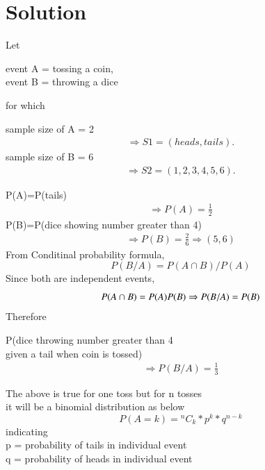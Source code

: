 \documentclass[journal,12pt,twocolumn]{IEEEtran}
\begin{document}
\section{Solution}
Let
\begin{center}
event A = tossing a coin,\\
event B = throwing a dice\\
\end{center}
for which\\
\begin{center}
sample size of A = 2
\begin{align*}
\Rightarrow S1={(heads,tails).}
\end{align*}
sample size of B = 6
\begin{align*}
\Rightarrow S2=(1,2,3,4,5,6).
\end{align*}
\end{center}
P(A)=P(tails)
\begin{align}
\Rightarrow P(A)=\frac{1}{2}
\end{align}
P(B)=P(dice showing number greater than 4)\\
\begin{align}
\Rightarrow P(B)=\frac{2}{6} \Rightarrow (5,6)
\end{align}
From Conditinal probability formula,
\begin{equation}
P(B/A)=P(A\cap B)/P(A)
\end{equation}
Since both are independent events,
\begin{equation}
P(A\cap B)=P(A)P(B)\\
\Rightarrow P(B/A)=P(B)
\end{equation}
Therefore
\begin{center}
P(dice throwing number greater than 4\\
given a tail when coin is tossed)
\begin{align*}
\Rightarrow P(B/A) = \frac {1}{3}
\end{align*}
\end{center}
The above is true for one toss but for n tosses\\
it will be a binomial distribution as below\\
\begin{equation}
 P(A=k)= { }^{n}C_{k}*p^{k}*q^{n-k} 
\end{equation}
indicating \\
p = probability of tails in individual event\\
q = probability of heads in individual event\\
\end{document}
